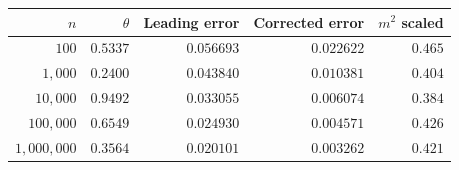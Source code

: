 \begin{tabular}{rrrrr}
\toprule
$n$ & $\theta$ & Leading error & Corrected error & $m^2$ scaled\\
\midrule
$100$ & $0.5337$ & $0.056693$ & $0.022622$ & $0.465$\\
$1,000$ & $0.2400$ & $0.043840$ & $0.010381$ & $0.404$\\
$10,000$ & $0.9492$ & $0.033055$ & $0.006074$ & $0.384$\\
$100,000$ & $0.6549$ & $0.024930$ & $0.004571$ & $0.426$\\
$1,000,000$ & $0.3564$ & $0.020101$ & $0.003262$ & $0.421$\\
\bottomrule
\end{tabular}
